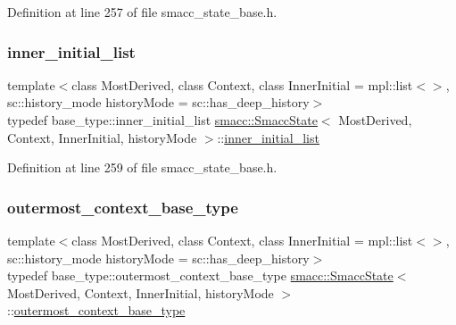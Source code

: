 Definition at line 257 of file smacc\+\_\+state\+\_\+base.\+h.

\mbox{\label{classsmacc_1_1SmaccState_acb4ac84bce421d39b594510a6b2df558}} 
\subsubsection{\texorpdfstring{inner\+\_\+initial\+\_\+list}{inner\_initial\_list}}
{\footnotesize\ttfamily template$<$class Most\+Derived, class Context, class Inner\+Initial = mpl\+::list$<$$>$, sc\+::history\+\_\+mode history\+Mode = sc\+::has\+\_\+deep\+\_\+history$>$ \\
typedef base\+\_\+type\+::inner\+\_\+initial\+\_\+list \hyperlink{classsmacc_1_1SmaccState}{smacc\+::\+Smacc\+State}$<$ Most\+Derived, Context, Inner\+Initial, history\+Mode $>$\+::\hyperlink{classsmacc_1_1SmaccState_acb4ac84bce421d39b594510a6b2df558}{inner\+\_\+initial\+\_\+list}}



Definition at line 259 of file smacc\+\_\+state\+\_\+base.\+h.

\mbox{\label{classsmacc_1_1SmaccState_aaf76bbe2aa9dd73e3284605f84ab4b16}} 
\subsubsection{\texorpdfstring{outermost\+\_\+context\+\_\+base\+\_\+type}{outermost\_context\_base\_type}}
{\footnotesize\ttfamily template$<$class Most\+Derived, class Context, class Inner\+Initial = mpl\+::list$<$$>$, sc\+::history\+\_\+mode history\+Mode = sc\+::has\+\_\+deep\+\_\+history$>$ \\
typedef base\+\_\+type\+::outermost\+\_\+context\+\_\+base\+\_\+type \hyperlink{classsmacc_1_1SmaccState}{smacc\+::\+Smacc\+State}$<$ Most\+Derived, Context, Inner\+Initial, history\+Mode $>$\+::\hyperlink{classsmacc_1_1SmaccState_aaf76bbe2aa9dd73e3284605f84ab4b16}{outermost\+\_\+context\+\_\+base\+\_\+type}}



